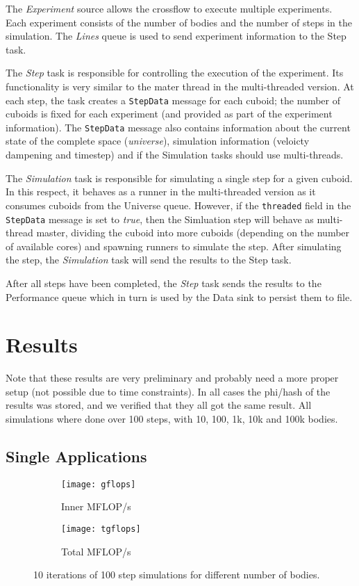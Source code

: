 \documentclass[11pt,a4paper]{article}
\begin{document}
The \emph{Experiment} source allows the crossflow to execute multiple experiments.
Each experiment consists of the number of bodies and the number of steps in the simulation.
The \emph{Lines} queue is used to send experiment information to the Step task.

The \emph{Step} task is responsible for controlling the execution of the experiment.
Its functionality is very similar to the mater thread in the multi-threaded version.
At each step, the task creates a \texttt{StepData} message for each cuboid; the number of cuboids is fixed for each experiment (and provided as part of the experiment information).
The \texttt{StepData} message also contains information about the current state of the complete space (\emph{universe}), simulation information (veloicty dampening and timestep) and if the Simulation tasks should use multi-threads.

The \emph{Simulation} task is responsible for simulating a single step for a given cuboid.
In this respect, it behaves as a runner in the multi-threaded version as it consumes cuboids from the Universe queue.
However, if the \texttt{threaded} field in the \texttt{StepData} message is set to \emph{true}, then the Simluation step will behave as multi-thread master, dividing the cuboid into more cuboids (depending on the number of available cores) and spawning runners to simulate the step.
After simulating the step, the \emph{Simulation} task will send the results to the Step task.

After all steps have been completed, the \emph{Step} task sends the results to the Performance queue which in turn is used by the Data sink to persist them to file.
   
\section{Results}

Note that these results are very preliminary and probably need a more proper setup (not possible due to time constraints).
In all cases the phi/hash of the results was stored, and we verified that they all got the same result.
All simulations where done over 100 steps, with 10, 100, 1k, 10k and 100k bodies.

\subsection{Single Applications}

\begin{figure}
    \centering
    \begin{subfigure}{.5\textwidth}
        \centering
        \texttt{[image: gflops]}
        \caption{Inner MFLOP/s}
        \label{fig:gflops}
    \end{subfigure}%
    \begin{subfigure}{.5\textwidth}
        \centering
        \texttt{[image: tgflops]}
        \caption{Total MFLOP/s}
        \label{fig:tgflops}
    \end{subfigure}%
\caption{10 iterations of 100 step simulations for different number of bodies.}
\end{figure}
\end{document}
